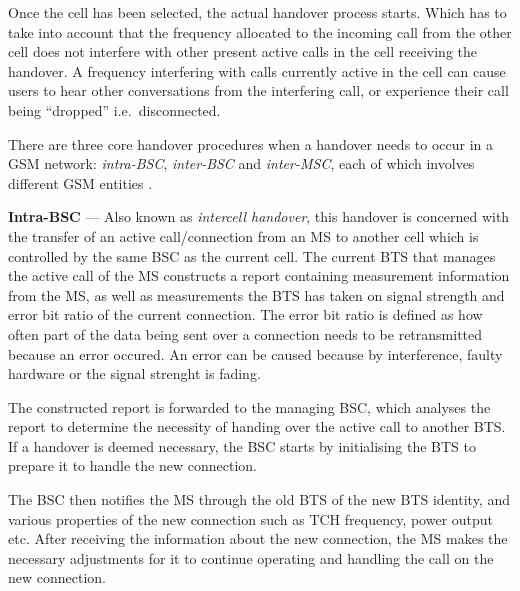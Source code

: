 Once the cell has been selected, the actual handover process starts. Which has to take into account that the frequency allocated to the incoming call from the other cell does not interfere with other present active calls in the cell receiving the handover\cite{Eisenblatter,GSMArchitectureProtocolsServices,wirelesstelcoMullet}. A frequency interfering with calls currently active in the cell can cause users to hear other conversations from the interfering call, or experience their call being ``dropped'' i.e.\ disconnected\cite{Eisenblatter}. 

There are three core handover procedures when a handover needs to occur in a GSM network: \emph{intra-BSC}, \emph{inter-BSC} and \emph{inter-MSC}, each of which involves different GSM entities \cite{wirelesstelcoMullet}.

\begin{description}
\item{\textbf{Intra-BSC}} --- Also known as \emph{intercell handover}, this handover is concerned with the transfer of an active call/connection from an MS to another cell which is controlled by the same BSC as the current cell\cite{wirelesstelcoMullet,GSMArchitectureProtocolsServices}. The current BTS that manages the active call of the MS constructs a report containing measurement information from the MS, as well as measurements the BTS has taken on signal strength and error bit ratio of the current connection\cite{wirelesstelcoMullet,GSMArchitectureProtocolsServices}. The error bit ratio is defined as how often part of the data being sent over a connection needs to be retransmitted because an error occured\cite{wirelesstelcoMullet,GSMArchitectureProtocolsServices}. An error can be caused because by interference, faulty hardware or the signal strenght is fading\cite{wirelesstelcoMullet,GSMArchitectureProtocolsServices}. 

The constructed report is forwarded to the managing BSC, which analyses the report to determine the necessity of handing over the active call to another BTS\@. If a handover is deemed necessary, the BSC starts by initialising the BTS to prepare it to handle the new connection\cite{wirelesstelcoMullet,GSMArchitectureProtocolsServices}.

The BSC then notifies the MS through the old BTS of the new BTS identity, and various properties of the new connection such as TCH frequency, power output etc. After receiving the information about the new connection, the MS makes the necessary adjustments for it to continue operating and handling the call on the new connection\cite{wirelesstelcoMullet,GSMArchitectureProtocolsServices}. 


\end{description}
